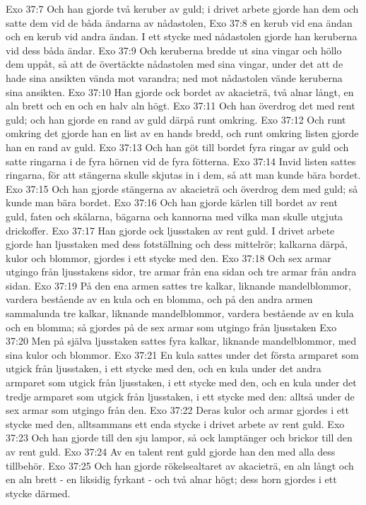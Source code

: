 Exo 37:7  Och han gjorde två keruber av guld; i drivet arbete gjorde han dem och satte dem vid de båda ändarna av nådastolen,
Exo 37:8  en kerub vid ena ändan och en kerub vid andra ändan. I ett stycke med nådastolen gjorde han keruberna vid dess båda ändar.
Exo 37:9  Och keruberna bredde ut sina vingar och höllo dem uppåt, så att de övertäckte nådastolen med sina vingar, under det att de hade sina ansikten vända mot varandra; ned mot nådastolen vände keruberna sina ansikten.
Exo 37:10  Han gjorde ock bordet av akacieträ, två alnar långt, en aln brett och en och en halv aln högt.
Exo 37:11  Och han överdrog det med rent guld; och han gjorde en rand av guld därpå runt omkring.
Exo 37:12  Och runt omkring det gjorde han en list av en hands bredd, och runt omkring listen gjorde han en rand av guld.
Exo 37:13  Och han göt till bordet fyra ringar av guld och satte ringarna i de fyra hörnen vid de fyra fötterna.
Exo 37:14  Invid listen sattes ringarna, för att stängerna skulle skjutas in i dem, så att man kunde bära bordet.
Exo 37:15  Och han gjorde stängerna av akacieträ och överdrog dem med guld; så kunde man bära bordet.
Exo 37:16  Och han gjorde kärlen till bordet av rent guld, faten och skålarna, bägarna och kannorna med vilka man skulle utgjuta drickoffer.
Exo 37:17  Han gjorde ock ljusstaken av rent guld. I drivet arbete gjorde han ljusstaken med dess fotställning och dess mittelrör; kalkarna därpå, kulor och blommor, gjordes i ett stycke med den.
Exo 37:18  Och sex armar utgingo från ljusstakens sidor, tre armar från ena sidan och tre armar från andra sidan.
Exo 37:19  På den ena armen sattes tre kalkar, liknande mandelblommor, vardera bestående av en kula och en blomma, och på den andra armen sammalunda tre kalkar, liknande mandelblommor, vardera bestående av en kula och en blomma; så gjordes på de sex armar som utgingo från ljusstaken
Exo 37:20  Men på själva ljusstaken sattes fyra kalkar, liknande mandelblommor, med sina kulor och blommor.
Exo 37:21  En kula sattes under det första armparet som utgick från ljusstaken, i ett stycke med den, och en kula under det andra armparet som utgick från ljusstaken, i ett stycke med den, och en kula under det tredje armparet som utgick från ljusstaken, i ett stycke med den: alltså under de sex armar som utgingo från den.
Exo 37:22  Deras kulor och armar gjordes i ett stycke med den, alltsammans ett enda stycke i drivet arbete av rent guld.
Exo 37:23  Och han gjorde till den sju lampor, så ock lamptänger och brickor till den av rent guld.
Exo 37:24  Av en talent rent guld gjorde han den med alla dess tillbehör.
Exo 37:25  Och han gjorde rökelsealtaret av akacieträ, en aln långt och en aln brett - en liksidig fyrkant - och två alnar högt; dess horn gjordes i ett stycke därmed.
